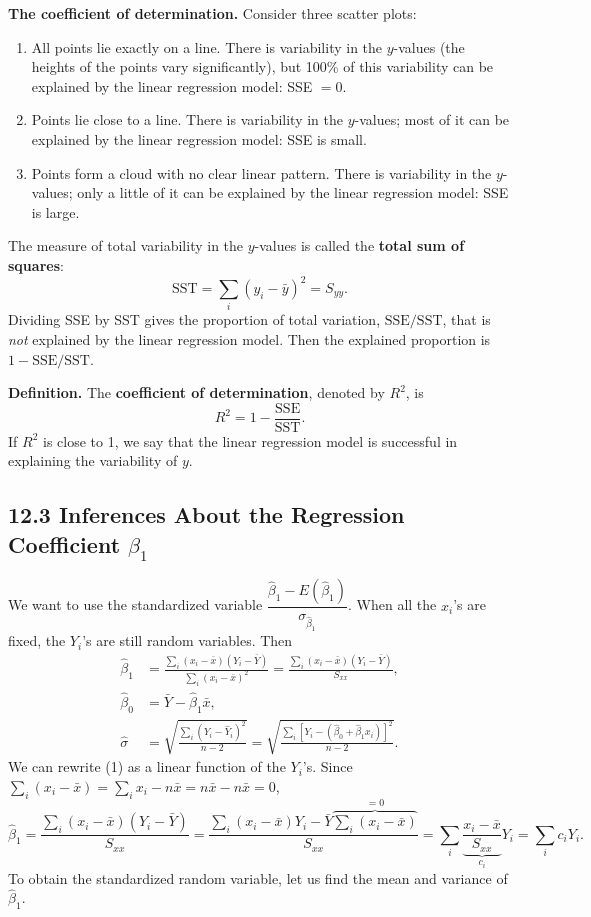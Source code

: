 \textbf{The coefficient of determination.} Consider three scatter plots:
\begin{enumerate}
  \item All points lie exactly on a line. There is variability in the $y$-values (the heights of the points vary significantly), but 100\% of this variability can be explained by the linear regression model: SSE $=0$.
  \item Points lie close to a line. There is variability in the $y$-values; most of it can be explained by the linear regression model: SSE is small.
  \item Points form a cloud with no clear linear pattern. There is variability in the $y$-values; only a little of it can be explained by the linear regression model: SSE is large.
\end{enumerate}

The measure of total variability in the $y$-values is called the \textbf{total sum of squares}:
\[
\mathrm{SST}=\sum_i(y_i-\bar{y})^2=S_{yy}.
\]
Dividing SSE by SST gives the proportion of total variation, $\mathrm{SSE}/\mathrm{SST}$, that is \emph{not} explained by the linear regression model.
Then the explained proportion is $1-\mathrm{SSE}/\mathrm{SST}$.

\textbf{Definition.} The \textbf{coefficient of determination}, denoted by $R^2$, is
\[
R^2=1-\frac{\mathrm{SSE}}{\mathrm{SST}}.
\]
If $R^2$ is close to 1, we say that the linear regression model is successful in explaining the variability of $y$.

\subsection*{12.3 Inferences About the Regression Coefficient $\beta_1$}

We want to use the standardized variable $\dfrac{\hat\beta_1-E(\hat\beta_1)}{\sigma_{\hat\beta_1}}$.
When all the $x_i$'s are fixed, the $Y_i$'s are still random variables. Then
\begin{align*}
\hat\beta_1 &= \frac{\sum_i(x_i-\bar{x})(Y_i-\bar{Y})}{\sum_i(x_i-\bar{x})^2}=\frac{\sum_i(x_i-\bar{x})(Y_i-\bar{Y})}{S_{xx}}, \tag{1}\\
\hat\beta_0 &= \bar{Y}-\hat\beta_1\bar{x}, \tag{2}\\
\hat\sigma &= \sqrt{\frac{\sum_i(Y_i-\hat{Y}_i)^2}{n-2}} = \sqrt{\frac{\sum_i\left[Y_i-(\hat\beta_0+\hat\beta_1x_i)\right]^2}{n-2}}. \tag{3}
\end{align*}
We can rewrite (1) as a linear function of the $Y_i$'s. Since $\sum_i(x_i-\bar{x})=\sum_i x_i-n\bar{x}=n\bar{x}-n\bar{x}=0$,
\[
\hat\beta_1=\frac{\sum_i(x_i-\bar{x})(Y_i-\bar{Y})}{S_{xx}}=\frac{\sum_i(x_i-\bar{x})Y_i-\bar{Y}\overbrace{\sum_i(x_i-\bar{x})}^{=0}}{S_{xx}}
=\sum_i\underbrace{\frac{x_i-\bar{x}}{S_{xx}}}_{c_i}Y_i=\sum_i c_iY_i .
\]
To obtain the standardized random variable, let us find the mean and variance of $\hat\beta_1$.

